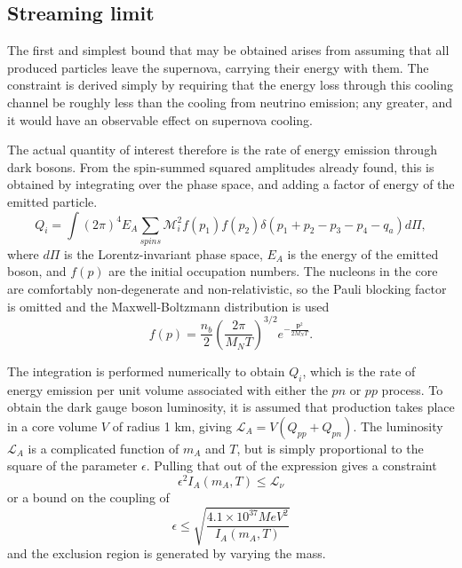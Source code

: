 \documentclass[nofootinbib,aps,prd,preprint,superscriptaddress]{revtex4}
\newcommand{\beq}{\begin{equation}}
\newcommand{\eeq}{\end{equation}}
\begin{document}
\subsection{Streaming limit}
The first and simplest bound that may be obtained arises from assuming that all produced particles leave the supernova, carrying their energy with them. The constraint is derived simply by requiring that the energy loss through this cooling channel be roughly less than the cooling from neutrino emission; any greater, and it would have an observable effect on supernova cooling.

The actual quantity of interest therefore is the rate of energy emission through dark bosons. From the spin-summed squared amplitudes already found, this is obtained by integrating over the phase space, and adding a factor of energy of the emitted particle.
\beq
Q_i = \int (2\pi)^4 E_A \sum_{spins} \mathcal{M}^2_i f(p_1) f(p_2)\delta(p_1+p_2-p_3-p_4-q_a) d\Pi,
\eeq
where $d\Pi$ is the Lorentz-invariant phase space, $ E_A $ is the energy of the emitted boson, and $ f(p) $ are the initial occupation numbers. The nucleons in the core are comfortably non-degenerate and non-relativistic, so  the Pauli blocking factor is omitted and the Maxwell-Boltzmann distribution is used  
\beq
f(p) =  \frac{n_b}{2} (\frac{2 \pi}{M_N T})^{3/2} e^{-\frac{\textbf{p}^2} {2 M_N T}}.
\eeq
	
The integration is performed numerically to obtain $ Q_i$, which is the rate of energy emission per unit volume associated with either the $pn$ or $pp$ process. To obtain the dark gauge boson luminosity, it is assumed that production takes place in a core volume $V$ of radius 1 km, giving $ \mathcal{L}_A = V(Q_{pp} + Q_{pn}) $. The luminosity $\mathcal{L}_A $ is a complicated function of $ m_A $ and $ T $, but is simply proportional to the square of the parameter $ \epsilon $.  Pulling that out of the expression gives a constraint 
\beq
\epsilon^2 I_A(m_A, T) \le \mathcal{L}_\nu
\eeq
or a bound on the coupling of 
\beq 
\epsilon \le \sqrt{\frac{4.1 \times 10^{37} MeV^2}{I_A(m_A, T)}} 
\eeq 
and the exclusion region is generated by varying the mass. 
\end{document}
